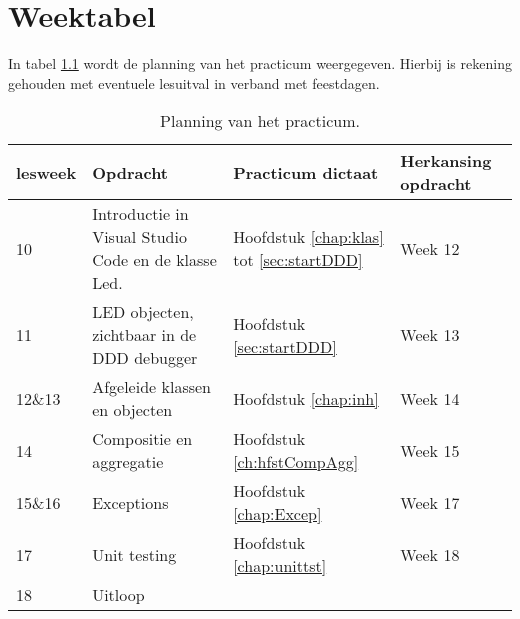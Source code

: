 \chapter{Weektabel}

In tabel \ref{tabel:wkplan} wordt de planning van het practicum weergegeven. 
Hierbij is rekening gehouden met eventuele lesuitval in verband met feestdagen. 
\begin{table}[h!]
	\begin{tabular}{ | m{1.5cm} | m{7cm} |p{2.6cm}|p{3cm}| } 
		\hline
lesweek &Opdracht & Practicum dictaat &Herkansing opdracht \\ \hline
	10	& Introductie in Visual Studio Code en de klasse Led. & Hoofdstuk \ref{chap:klas} tot \ref{sec:startDDD}& Week 12\\ \hline
	11	&   LED objecten, zichtbaar in de DDD debugger &  Hoofdstuk \ref{sec:startDDD}&Week 13 \\ \hline
	12\&13	&  Afgeleide klassen en objecten & Hoofdstuk \ref{chap:inh} &Week 14\\ \hline
	14	&Compositie en aggregatie    & Hoofdstuk \ref{ch:hfstCompAgg}&Week 15 \\ \hline
	15\&16	& Exceptions   & Hoofdstuk \ref{chap:Excep}& Week 17 \\ \hline
	17	&Unit testing  & Hoofdstuk \ref{chap:unittst} & Week 18\\ \hline	
	18 &Uitloop& &\\ \hline
	\end{tabular}  
    \caption{Planning van het practicum.}
    \label{tabel:wkplan}
\end{table}

